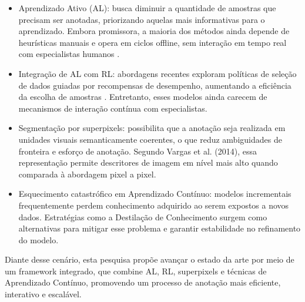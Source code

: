 \begin{itemize}

\item Aprendizado Ativo (\ac{AL}): busca diminuir a quantidade de amostras que precisam ser anotadas, priorizando aquelas mais informativas para o aprendizado. Embora promissora, a maioria dos métodos ainda depende de heurísticas manuais e opera em ciclos offline, sem interação em tempo real com especialistas humanos \cite{kim2023adaptive,konyushkova2017learning}. %

\item Integração de \ac{AL} com \ac{RL}: abordagens recentes exploram políticas de seleção de dados guiadas por recompensas de desempenho, aumentando a eficiência da escolha de amostras \cite{fang2017active}. %
Entretanto, esses modelos ainda carecem de mecanismos de interação contínua com especialistas.

\item Segmentação por superpixels: possibilita que a anotação seja realizada em unidades visuais semanticamente coerentes, o que reduz ambiguidades de fronteira e esforço de anotação. Segundo Vargas et al. (2014), essa representação permite descritores de imagem em nível mais alto quando comparada à abordagem pixel a pixel.

\item Esquecimento catastrófico em Aprendizado Contínuo: modelos incrementais frequentemente perdem conhecimento adquirido ao serem expostos a novos dados. Estratégias como a Destilação de Conhecimento surgem como alternativas para mitigar esse problema e garantir estabilidade no refinamento do modelo.

\end{itemize}

Diante desse cenário, esta pesquisa propõe avançar o estado da arte por meio de um framework integrado, que combine \ac{AL}, \ac{RL}, superpixels e técnicas de Aprendizado Contínuo, promovendo um processo de anotação mais eficiente, interativo e escalável.



